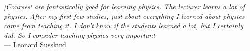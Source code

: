 \documentclass[a4paper,12pt]{article}
\numberwithin{equation}{section}
\begin{document}
\vspace{20mm}

\noindent
\emph{[Courses] are fantastically good for learning physics. The lecturer learns a lot of physics. After my first few studies, just about everything I learned about physics came from teaching it. I don’t know if the students learned a lot, but I certainly did. So I consider teaching physics very important.} \\
\hspace*{0.6\linewidth} --- Leonard Susskind \cite{Susskind}

\newpage


\end{document}
